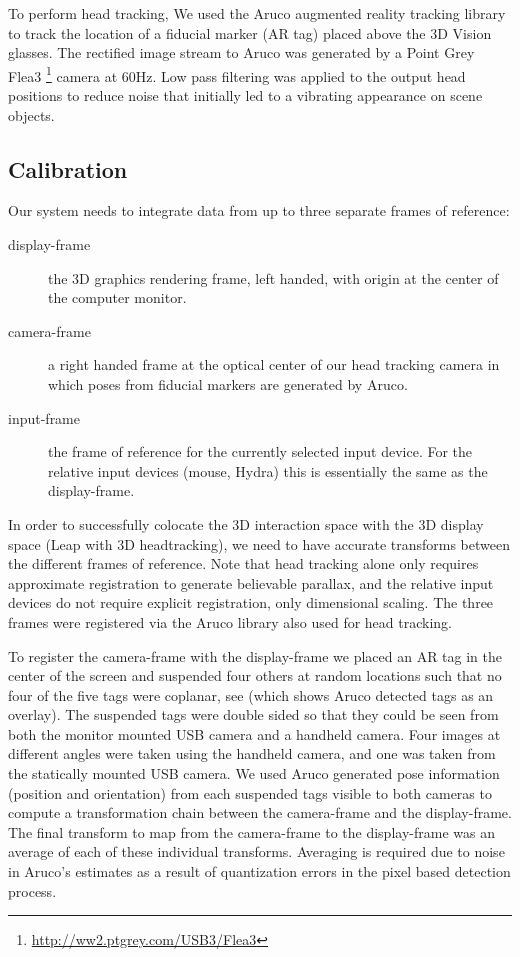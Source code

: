 To perform head tracking, We used the Aruco augmented reality tracking library
\cite{aruco} to track the location of a fiducial marker (AR tag) placed above
the 3D Vision glasses.  The rectified image stream to Aruco was generated by a
Point Grey Flea3 \footnote{\url{http://ww2.ptgrey.com/USB3/Flea3}} camera at
60Hz.  Low pass filtering was applied to the output head positions to reduce
noise that initially led to a vibrating appearance on scene objects.

\subsection{Calibration}

Our system needs to integrate data from up to three separate frames of
reference:

\begin{description}

\item[display-frame] the 3D graphics rendering frame, left handed, with origin
  at the center of the computer monitor.

\item[camera-frame] a right handed frame at the optical center of our head
  tracking camera in which poses from fiducial markers are generated by Aruco.

\item[input-frame] the frame of reference for the currently selected input
  device.  For the relative input devices (mouse, Hydra) this is essentially
  the same as the display-frame.

\end{description}

In order to successfully colocate the 3D interaction space with the 3D display
space (Leap with 3D headtracking), we need to have accurate transforms between
the different frames of reference.  Note that head tracking alone only
requires approximate registration to generate believable parallax, and the
relative input devices do not require explicit registration, only dimensional
scaling. The three frames were registered via the Aruco library also used for
head tracking.

To register the camera-frame with the display-frame we placed an AR tag in the
center of the screen and suspended four others at random locations such that
no four of the five tags were coplanar, see  (which shows
Aruco detected tags as an overlay).  The suspended tags were double sided so
that they could be seen from both the monitor mounted USB camera and a
handheld camera.  Four images at different angles were taken using the
handheld camera, and one was taken from the statically mounted USB camera.  We
used Aruco generated pose information (position and orientation) from each
suspended tags visible to both cameras to compute a transformation chain
between the camera-frame and the display-frame.  The final transform to map
from the camera-frame to the display-frame was an average of each of these
individual transforms.  Averaging is required due to noise in Aruco's
estimates as a result of quantization errors in the pixel based detection
process.

